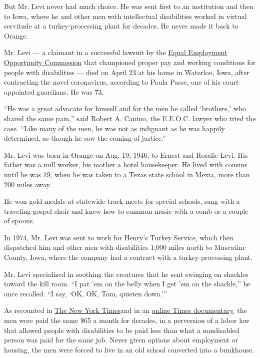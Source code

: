 But Mr. Levi never had much choice. He was sent first to an institution
and then to Iowa, where he and other men with intellectual disabilities
worked in virtual servitude at a turkey-processing plant for decades. He
never made it back to Orange.

Mr. Levi --- a claimant in a successful lawsuit by the
\href{https://www.eeoc.gov/}{Equal Employment Opportunity Commission}
that championed proper pay and working conditions for people with
disabilities --- died on April 23 at his home in Waterloo, Iowa, after
contracting the novel coronavirus, according to Paula Passe, one of his
court-appointed guardians. He was 73.

``He was a great advocate for himself and for the men he called
`brothers,' who shared the same pain,'' said Robert A. Canino, the
E.E.O.C. lawyer who tried the case. ``Like many of the men, he was not
as indignant as he was happily determined, as though he saw the coming
of justice.''

Mr. Levi was born in Orange on Aug. 19, 1946, to Ernest and Rosalie
Levi. His father was a mill worker, his mother a hotel housekeeper. He
lived with cousins until he was 19, when he was taken to a Texas state
school in Mexia, more than 200 miles away.

He won gold medals at statewide track meets for special schools, sang
with a traveling gospel choir and knew how to summon music with a comb
or a couple of spoons.

In 1974, Mr. Levi was sent to work for Henry's Turkey Service, which
then dispatched him and other men with disabilities 1,000 miles north to
Muscatine County, Iowa, where the company had a contract with a
turkey-processing plant.

Mr. Levi specialized in soothing the creatures that he sent swinging on
shackles toward the kill room. ``I pat 'em on the belly when I get 'em
on the shackle,'' he once recalled. ``I say, `OK, OK, Tom, quieten
down.'''

As recounted in
\href{https://www.nytimes3xbfgragh.onion/2014/07/31/us/from-schoolhouse-to-symbol-of-servitude-to-dust.html}{The
New York Times}and in an
\href{https://www.nytimes3xbfgragh.onion/2014/03/09/us/the-men-of-atalissa.html}{online
Times documentary}, the men were paid the same \$65 a month for decades,
in a perversion of a labor law that allowed people with disabilities to
be paid less than what a nondisabled person was paid for the same job.
Never given options about employment or housing, the men were forced to
live in an old school converted into a bunkhouse.

